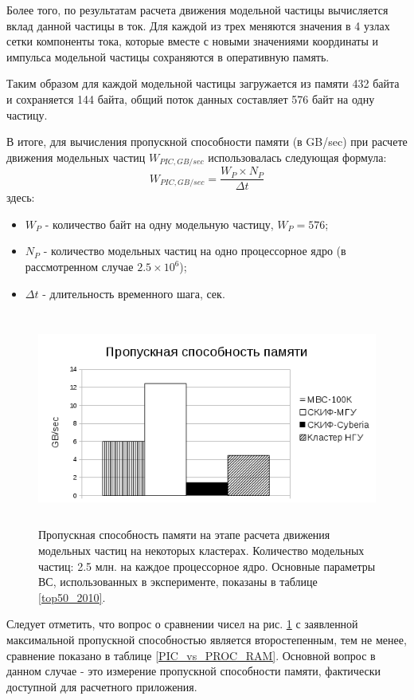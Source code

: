 Более того, по результатам расчета движения модельной частицы вычисляется вклад данной частицы в ток. Для каждой из трех меняются значения в 4 узлах сетки компоненты тока, которые вместе с новыми значениями координаты и импульса модельной частицы сохраняются в оперативную память.

Таким образом для каждой модельной частицы загружается из памяти 432 байта и сохраняется 144 байта, общий поток данных составляет 576 байт на одну частицу.

В итоге, для вычисления пропускной способности памяти (в GB/sec) при расчете движения модельных частиц $W_{PIC,GB/sec}$ использовалась следующая формула:
$$
W_{PIC,GB/sec} = \frac{W_P\times N_P }{\Delta t}
$$
здесь:
\begin{itemize}
	\item $W_P$ - количество байт на одну модельную частицу, $W_P = 576$;
	\item $N_P$ - количество модельных частиц на одно процессорное ядро (в рассмотренном случае $2.5\times 10^6$);  
	\item $\Delta t$  - длительность временного шага, сек.
\end{itemize}	




\begin{figure}[htb]
	\begin{center}
		\includegraphics[height=7cm,keepaspectratio]{images/data_proc_throughput_GBsec.png}
	\end{center}
	\caption{Пропускная способность памяти на этапе расчета движения модельных частиц на некоторых кластерах. Количество модельных частиц: 2.5 млн. на каждое процессорное ядро. Основные параметры ВС, использованных в эксперименте, показаны в таблице \ref{top50_2010}.}
	\label{PIC_RAM}
\end{figure}
Следует отметить, что вопрос о сравнении чисел на рис. \ref{PIC_RAM} с заявленной максимальной пропускной способностью 
является второстепенным, тем не менее, сравнение показано в таблице \ref{PIC_vs_PROC_RAM}. Основной вопрос в данном случае - это измерение пропускной способности памяти,  фактически доступной для расчетного приложения.

